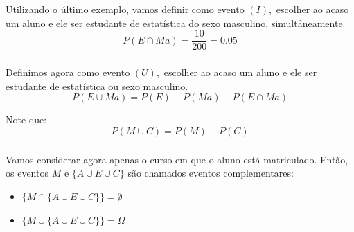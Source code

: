 \documentclass[14pt,aspectratio=1610]{beamer}
\begin{document}
\begin{frame}{}
\frametitle{}
\begin{block}{}
\justifying
Utilizando o último exemplo, vamos definir como evento $(I),$ escolher ao acaso um aluno e ele ser estudante de estatística do sexo masculino, simultâneamente.
$$P(E\cap Ma)=\dfrac{10}{200}=0.05$$
\end{block}
\end{frame}

\begin{frame}{}
\frametitle{}
\begin{block}{}
\justifying
Definimos agora como evento $(U),$ escolher ao acaso um aluno e ele ser estudante de estatística ou sexo masculino.
$$P(E\cup Ma)=P(E)+P(Ma)-P(E\cap Ma)$$

Note que: $$P(M\cup C)=P(M)+P(C)$$
\end{block}
\end{frame}

\begin{frame}{}
\frametitle{}
\begin{block}{}
\justifying
Vamos considerar agora apenas o curso em que o aluno está matriculado. Então, os eventos $M$ e $\{A\cup E \cup C\}$ são chamados eventos complementares:
\begin{itemize}
\item $\{M\cap \{A\cup E \cup C\}\}=\emptyset$
\item $\{M\cup \{A\cup E \cup C\}\}=\Omega$
\end{itemize}
\end{block}
\end{frame}

%
\end{document}
